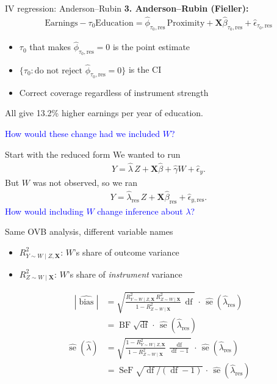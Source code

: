 \documentclass[xcolor=dvipsnames]{beamer}
\newcommand\X{{\bm X}}
\DeclareMathOperator{\se}{se}
\DeclareMathOperator{\df}{df}
\DeclareMathOperator{\bias}{bias}
\DeclareMathOperator{\BF}{BF}
\DeclareMathOperator{\SeF}{SeF}
\begin{document}
\begin{frame}{IV regression: Anderson--Rubin}
\textbf{3. Anderson--Rubin (Fieller):}
\begin{align*}
\text{Earnings} - \tau_0 \text{Education} = \hat{\phi}_{\tau_0,\text{res}}\,\text{Proximity} + \X\hat{\beta}_{\tau_0,\text{res}} + \hat{\epsilon}_{\tau_0, \text{res}}
\end{align*}
\small
\begin{itemize}
\item $\tau_0$ that makes $\hat{\phi}_{\tau_0,\text{res}} = 0$ is the point estimate
\item $\{\tau_0 : \text{do not reject } \hat{\phi}_{\tau_0,\text{res}} = 0\}$ is the CI
\item Correct coverage regardless of instrument strength
\end{itemize}
\bigskip
{} All give 13.2\% higher earnings per year of education.
\medskip
\begin{center}
 \textcolor{blue}{How would these change had we included $W$?}
\end{center}
\end{frame}


\begin{frame}{Start with the reduced form}
 We wanted to run
\begin{align*}
Y = \hat{\lambda}\, Z + \X\hat{\beta} + \hat{\gamma} W + \hat{\epsilon}_y.
\end{align*}
\medskip
{} But $W$ was not observed, so we ran
\begin{align*}
Y = \hat{\lambda}_{\text{res}}\, Z + \X\hat{\beta}_{\text{res}} + \hat{\epsilon}_{y,\text{res}}.
\end{align*}
\medskip
{} \textcolor{blue}{How would including $W$ change inference about $\lambda$?}
\end{frame}


\begin{frame}{Same OVB analysis, different variable names}
\begin{itemize}
\item $R^2_{Y\sim W \mid Z, \X}$: $W$'s share of outcome variance
\item $R^2_{Z\sim W \mid \X}$: $W$'s share of \textit{instrument} variance
\end{itemize}
\begin{align*}
|\widehat{\bias}|
&= \sqrt{\frac{R^2_{Y\sim W \mid Z, \X}\, R^2_{Z\sim W \mid \X}}{1 - R^2_{Z\sim W \mid \X}}\,\df}\,\cdot\,\widehat{\se}(\hat{\lambda}_{\text{res}}) \\
&= \BF\sqrt{\df}\,\cdot\,\widehat{\se}(\hat{\lambda}_{\text{res}})
\end{align*}
\begin{align*}
\widehat{\se}(\hat{\lambda})
&= \sqrt{\frac{1 - R^2_{Y\sim W \mid Z, \X}}{1 - R^2_{Z\sim W \mid \X}}\,\frac{\df}{\df-1}}\,\cdot\,\widehat{\se}(\hat{\lambda}_{\text{res}}) \\
&= \SeF\sqrt{\df/(\df-1)}\,\cdot\,\widehat{\se}(\hat{\lambda}_{\text{res}})
\end{align*}
\end{frame}
\end{document}
